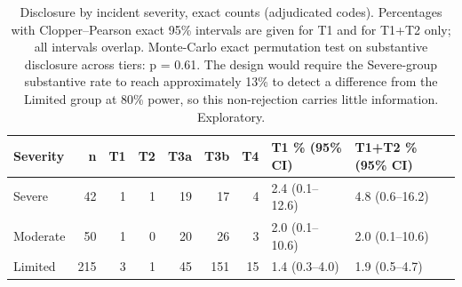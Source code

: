 \documentclass[utf8]{FrontiersinHarvard}
\begin{document}
\begin{table}[h!]
\caption{Disclosure by incident severity, exact counts (adjudicated codes). Percentages with Clopper--Pearson exact 95\% intervals are given for T1 and for T1+T2 only; all intervals overlap. Monte-Carlo exact permutation test on substantive disclosure across tiers: p = 0.61. The design would require the Severe-group substantive rate to reach approximately 13\% to detect a difference from the Limited group at 80\% power, so this non-rejection carries little information. Exploratory.}
\label{tab:sev}
\small
\begin{center}
\begin{tabular}{@{}lrrrrrrll@{}}
\toprule
Severity & n & T1 & T2 & T3a & T3b & T4 & T1 \% (95\% CI) & T1+T2 \% (95\% CI) \\ \midrule
Severe & 42 & 1 & 1 & 19 & 17 & 4 & 2.4 (0.1--12.6) & 4.8 (0.6--16.2) \\
Moderate & 50 & 1 & 0 & 20 & 26 & 3 & 2.0 (0.1--10.6) & 2.0 (0.1--10.6) \\
Limited & 215 & 3 & 1 & 45 & 151 & 15 & 1.4 (0.3--4.0) & 1.9 (0.5--4.7) \\
\bottomrule
\end{tabular}
\end{center}
\end{table}
\end{document}
